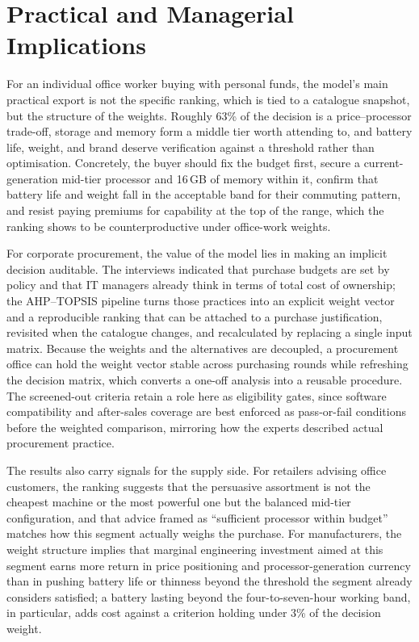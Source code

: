 \section{Practical and Managerial Implications}\label{sec:implications}

For an individual office worker buying with personal funds, the model's main practical
export is not the specific ranking, which is tied to a catalogue snapshot, but the
structure of the weights. Roughly 63\% of the decision is a price--processor trade-off,
storage and memory form a middle tier worth attending to, and battery life, weight, and
brand deserve verification against a threshold rather than optimisation. Concretely, the
buyer should fix the budget first, secure a current-generation mid-tier processor and
16\,GB of memory within it, confirm that battery life and weight fall in the acceptable
band for their commuting pattern, and resist paying premiums for capability at the top of
the range, which the ranking shows to be counterproductive under office-work weights.

For corporate procurement, the value of the model lies in making an implicit decision
auditable. The interviews indicated that purchase budgets are set by policy and that IT
managers already think in terms of total cost of ownership; the AHP--TOPSIS pipeline
turns those practices into an explicit weight vector and a reproducible ranking that can
be attached to a purchase justification, revisited when the catalogue changes, and
recalculated by replacing a single input matrix. Because the weights and the alternatives
are decoupled, a procurement office can hold the weight vector stable across purchasing
rounds while refreshing the decision matrix, which converts a one-off analysis into a
reusable procedure. The screened-out criteria retain a role here as eligibility gates, since
software compatibility and after-sales coverage are best enforced as pass-or-fail
conditions before the weighted comparison, mirroring how the experts described actual
procurement practice.

The results also carry signals for the supply side. For retailers advising office
customers, the ranking suggests that the persuasive assortment is not the cheapest machine
or the most powerful one but the balanced mid-tier configuration, and that advice framed
as ``sufficient processor within budget'' matches how this segment actually weighs the
purchase. For manufacturers, the weight structure implies that marginal engineering
investment aimed at this segment earns more return in price positioning and
processor-generation currency than in pushing battery life or thinness beyond the
threshold the segment already considers satisfied; a battery lasting beyond the four-to-seven-hour
working band, in particular, adds cost against a criterion holding under 3\% of
the decision weight.

